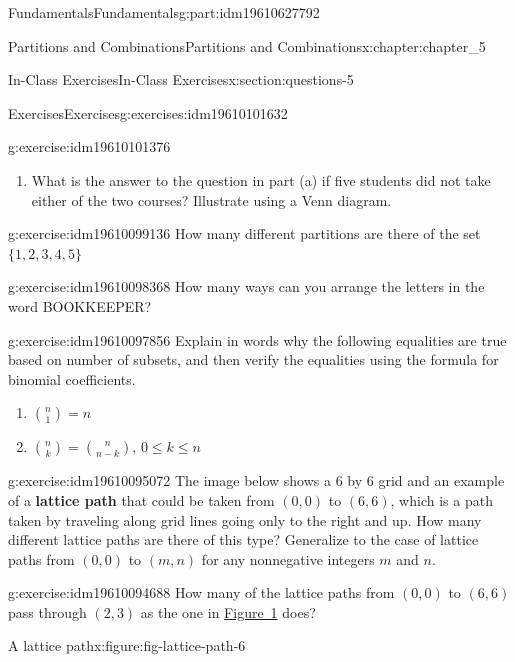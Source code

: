 \documentclass[oneside,10pt,]{book}
\newcommand{\terminology}[1]{\textbf{#1}}
\numberwithin{equation}{section}
\begin{document}
\begin{partptx}{Fundamentals}{}{Fundamentals}{}{}{g:part:idm19610627792}
\begin{chapterptx}{Partitions and Combinations}{}{Partitions and Combinations}{}{}{x:chapter:chapter_5}
\begin{sectionptx}{In-Class Exercises}{}{In-Class Exercises}{}{}{x:section:questions-5}
\begin{exercises-subsection-numberless}{Exercises}{}{Exercises}{}{}{g:exercises:idm19610101632}
\begin{exercisegroup}
\begin{divisionexerciseeg}{1}{}{}{g:exercise:idm19610101376}
\begin{enumerate}[label=(\alph*)]
\item{}What is the answer to the question in part (a) if five students did not take either of the two courses? Illustrate using a Venn diagram.%
\end{enumerate}
%
\end{divisionexerciseeg}%
\begin{divisionexerciseeg}{2}{}{}{g:exercise:idm19610099136}%
How many different partitions are there of the set \(\{1,2,3,4,5\}\)%
\end{divisionexerciseeg}%
\begin{divisionexerciseeg}{3}{}{}{g:exercise:idm19610098368}%
How many ways can you arrange the letters in the word BOOKKEEPER?%
\end{divisionexerciseeg}%
\begin{divisionexerciseeg}{4}{}{}{g:exercise:idm19610097856}%
Explain in words why the following equalities are true based on number of subsets,  and then verify the equalities using the formula for binomial coefficients.%
\par
%
\begin{enumerate}[label=(\alph*)]
\item{}\(\displaystyle \binom{n}{1} = n\)%
\item{}\(\binom{n}{k} = \binom{n}{n-k}\), \(0 \leq k \leq n\)%
\end{enumerate}
%
\end{divisionexerciseeg}%
\begin{divisionexerciseeg}{5}{}{}{g:exercise:idm19610095072}%
The image below shows a 6 by 6 grid and an example of a \terminology{lattice path} that could be taken from \((0,0)\)  to \((6,6)\), which is a path taken by traveling along grid lines going only to the right and up. How many different lattice paths are there of this type?  Generalize to the case of lattice paths from \((0,0)\) to \((m,n)\)  for any nonnegative integers \(m\) and \(n\).%
\end{divisionexerciseeg}%
\begin{divisionexerciseeg}{6}{}{}{g:exercise:idm19610094688}%
How many of the lattice paths from \((0,0)\) to \((6,6)\) pass through \((2,3)\) as the one in \hyperref[x:figure:fig-lattice-path-6]{Figure~1} does?%
\begin{figureptx}{A lattice path}{x:figure:fig-lattice-path-6}{}%
\begin{image}{0.25}{0.5}{0.25}%

\end{image}
\end{figureptx}
\end{divisionexerciseeg}
\end{exercisegroup}
\end{exercises-subsection-numberless}
\end{sectionptx}
\end{chapterptx}
\end{partptx}
\end{document}

